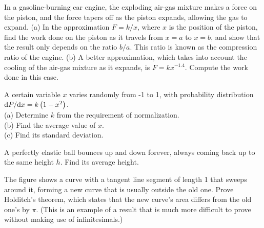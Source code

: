 \begin{hwsection}
\begin{hw}\label{hw:piston}
In a gasoline-burning car engine, the exploding air-gas
mixture makes a force on the piston, and the force tapers off as the piston expands, allowing the
gas to expand. (a) In the approximation $F=k/x$, where $x$ is the position of the piston, find the
work done on the piston as it travels from $x=a$ to $x=b$, and show that the result only depends
on the ratio $b/a$. This ratio is known as the compression ratio of the engine. (b) A better
approximation, which takes into account the cooling of the air-gas mixture as it expands, is
$F=kx^{-1.4}$. Compute the work done in this case.
\end{hw}


\begin{hw}
A certain variable $x$ varies randomly from -1 to 1, with probability distribution
$\textup{d} P/\textup{d} x=k\left(1-x^2\right)$.\\
(a) Determine $k$ from the requirement of normalization.\\
(b) Find the average value of $x$.\\
(c) Find its standard deviation.
\end{hw}

\begin{hw}[2]
A perfectly elastic ball bounces up and down forever, always coming back up to the same height $h$. Find
its average height.
\end{hw}


\begin{hw}[2]\label{hw:holditch}
The figure shows a curve with a tangent line segment of length 1 that sweeps around it, forming a new curve
that is usually outside the old one.
Prove Holditch's theorem, which states that the  new curve's area differs from the old one's
by $\pi$.
(This is an example of a result that is much more
difficult to prove without making use of infinitesimals.)
\end{hw}

\end{hwsection}
